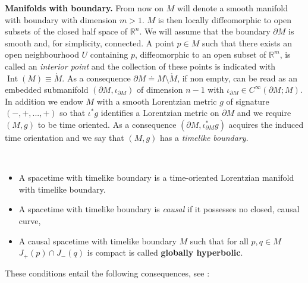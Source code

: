 \textbf{Manifolds with boundary.} From now on $M$ will denote a smooth manifold with boundary with dimension $m>1$. $M$ is then locally diffeomorphic to open subsets of the closed half space of $\mathbb{R}^n$. We will assume that the boundary $\partial M$ is smooth and, for simplicity, connected. A point $p\in M$ such that there exists an open neighbourhood $U$ containing $p$, diffeomorphic to an open subset of $\mathbb{R}^m$, is called an {\em interior point} and the collection of these points is indicated with $\operatorname{Int}(M)\equiv\mathring{M}$. As a consequence $\partial M\doteq M\setminus\mathring{M}$, if non empty, can be read as an embedded submanifold $(\partial M,\iota_{\partial M})$ of dimension $n-1$ with $\iota_{\partial M}\in C^\infty(\partial M; M)$.\\
In addition we endow $M$ with a smooth Lorentzian metric $g$ of signature $(-,+,...,+)$ so that $\iota^*g$ identifies a Lorentzian metric on $\partial M$ and we require $(M,g)$ to be time oriented. As a consequence $(\partial M,\iota^*_{\partial M}g)$ acquires the induced time orientation and we say that $(M,g)$ has a {\em timelike boundary}. 

\begin{Definition}\hfill\\
	\vspace{-0.6cm}
	\begin{itemize}
	\item A spacetime with timelike boundary is a time-oriented Lorentzian manifold with timelike boundary.
	\item A spacetime with timelike boundary is {\em causal} if it possesses no closed, causal curve,
	\item A causal spacetime with timelike boundary $M$ such that for all $p,q\in M$ $J_+(p)\cap J_-(q)$ is compact is called \textbf{globally hyperbolic}.
	\end{itemize}
\end{Definition}

These conditions entail the following consequences, see \cite[Th. 1.1 \& 3.14]{Ake-Flores-Sanchez-18}:

